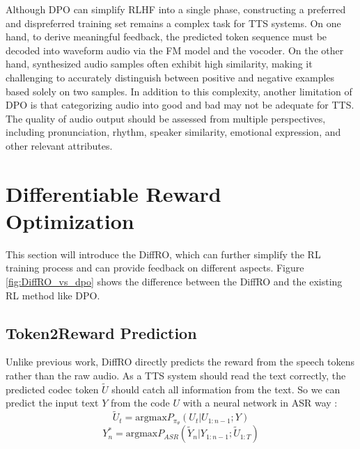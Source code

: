 \documentclass[a4paper]{article}
\begin{document}

Although DPO can simplify RLHF into a single phase, constructing a preferred and dispreferred training set remains a complex task for TTS systems.
On one hand, to derive meaningful feedback, the predicted token sequence must be decoded into waveform audio via the FM model and the vocoder. On the other hand, synthesized audio samples often exhibit high similarity, making it challenging to accurately distinguish between positive and negative examples based solely on two samples.
In addition to this complexity, another limitation of DPO is that categorizing audio into good and bad may not be adequate for TTS. The quality of audio output should be assessed from multiple perspectives, including pronunciation, rhythm, speaker similarity, emotional expression, and other relevant attributes.

\section{Differentiable Reward Optimization}
\label{S:3}

This section will introduce the DiffRO, which can further simplify the RL training process and can provide feedback on different aspects. Figure \ref{fig:DiffRO_vs_dpo} shows the difference between the DiffRO and the existing RL method like DPO.

\subsection{Token2Reward Prediction} 

Unlike previous work, DiffRO directly predicts the reward from the speech tokens rather than the raw audio. As a TTS system should read the text correctly, the predicted codec token $\tilde{U}$ should catch all information from the text. So we can predict the input text $Y$ from the code $U$ with a neural network in ASR way \cite{10374223}:
\begin{equation}
\tilde{U}_t = \text{argmax} P_{\pi_{\theta}}(U_t | U_{1:n-1}; Y)   \label{eq:gumbel}
\end{equation} 
\begin{equation}
Y_n^* = \text{argmax} P_{ASR}(\tilde{Y}_n | Y_{1:n-1}; \tilde{U}_{1:T})   
\end{equation}
\end{document}
